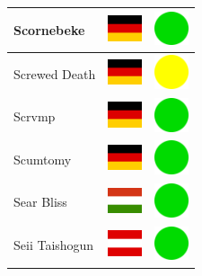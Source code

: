 \documentclass[12pt, a4paper, twoside]{report}
\begin{document}
\begin{center}
\begin{longtable}{|p{5cm}|p{2cm}|p{2cm}|}
 Scornebeke                                                 & \includegraphics[width=1cm]{../4x3/de} &   \includegraphics[width=1cm]{../likes/y} \\ \hline
 Screwed Death                                              & \includegraphics[width=1cm]{../4x3/de} &   \includegraphics[width=1cm]{../likes/m} \\ \hline
 Scrvmp                                                     & \includegraphics[width=1cm]{../4x3/de} &   \includegraphics[width=1cm]{../likes/y} \\ \hline
 Scumtomy                                                   & \includegraphics[width=1cm]{../4x3/de} &   \includegraphics[width=1cm]{../likes/y} \\ \hline
 Sear Bliss                                                 & \includegraphics[width=1cm]{../4x3/hu} &   \includegraphics[width=1cm]{../likes/y} \\ \hline
 Seii Taishogun                                             & \includegraphics[width=1cm]{../4x3/at} &   \includegraphics[width=1cm]{../likes/y} \\ \hline

\end{longtable}
\end{center}
\end{document}
